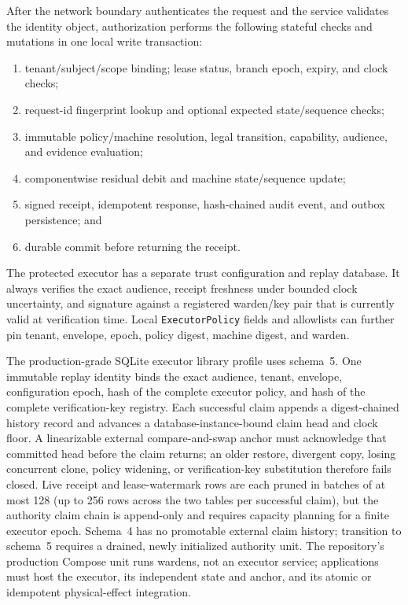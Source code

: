 \documentclass[10pt]{article}
\newcommand{\code}[1]{\nolinkurl{#1}}
\begin{document}
After the network boundary authenticates the request and the service validates the identity object,
authorization performs the following stateful checks and mutations in one local write transaction:
\begin{enumerate}
  \item tenant/subject/scope binding; lease status, branch epoch, expiry, and clock checks;
  \item request-id fingerprint lookup and optional expected state/sequence checks;
  \item immutable policy/machine resolution, legal transition, capability, audience, and evidence
  evaluation;
  \item componentwise residual debit and machine state/sequence update;
  \item signed receipt, idempotent response, hash-chained audit event, and outbox persistence; and
  \item durable commit before returning the receipt.
\end{enumerate}

The protected executor has a separate trust configuration and replay database. It always verifies
the exact audience, receipt freshness under bounded clock uncertainty, and signature against a
registered warden/key pair that is currently valid at verification time. Local
\code{ExecutorPolicy} fields and allowlists can further pin tenant, envelope, epoch, policy
digest, machine digest, and warden.

The production-grade SQLite executor library profile uses schema~5. One immutable replay identity
binds the exact audience, tenant, envelope, configuration epoch, hash of the complete executor
policy, and hash of the complete verification-key registry. Each successful claim appends a
digest-chained history record and advances a database-instance-bound claim head and clock floor. A
linearizable external compare-and-swap anchor must acknowledge that committed head before the
claim returns; an older restore, divergent copy, losing concurrent clone, policy widening, or
verification-key substitution therefore fails closed. Live receipt and lease-watermark rows are
each pruned in batches of at most 128 (up to 256 rows across the two tables per successful claim),
but the authority claim chain is append-only and requires capacity planning for a finite executor
epoch. Schema~4 has no promotable external claim history; transition to schema~5 requires a
drained, newly initialized authority unit. The repository's production Compose unit runs wardens,
not an executor service; applications must host the executor, its independent state and anchor,
and its atomic or idempotent physical-effect integration.
\end{document}
